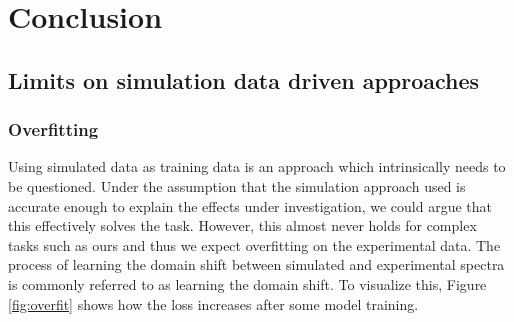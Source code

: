 


\chapter{Conclusion} %

\label{Chapter5} %


\section{Limits on simulation data driven approaches}

\subsection{Overfitting}
Using simulated data as training data is an approach which intrinsically needs to be questioned. Under the assumption that the simulation approach used is accurate enough to explain the effects under investigation, we could argue that this effectively solves the task. However, this almost never holds for complex tasks such as ours and thus we expect overfitting on the experimental data.
The process of learning the domain shift between simulated and experimental spectra is commonly referred to as learning the domain shift. To visualize this, Figure \ref{fig:overfit} shows how the loss increases after some model training. 



\subsection{}
